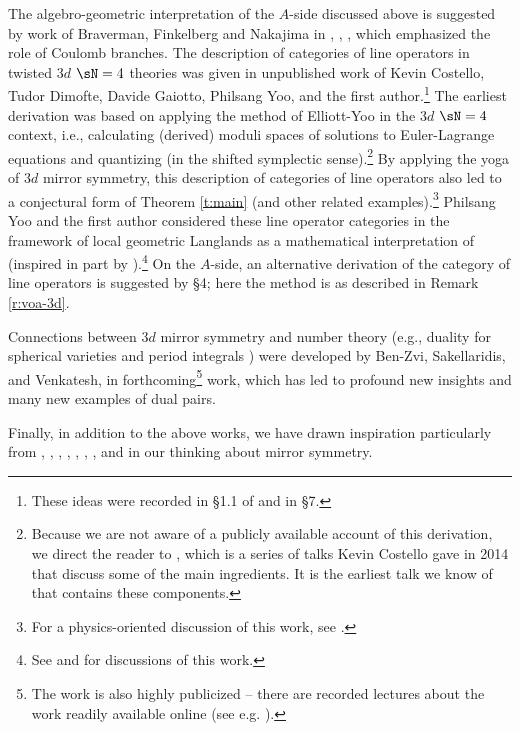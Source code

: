 The algebro-geometric interpretation of the $A$-side discussed
above is suggested by work of Braverman, Finkelberg and Nakajima
in \cite{nakajima-coulomb}, \cite{bfn}, \cite{bfn-slices},
which emphasized the role of Coulomb branches.
The description of categories of line operators in twisted $3d$ $\sN = 4$
theories was given in unpublished work of Kevin Costello,
Tudor Dimofte, Davide Gaiotto, Philsang Yoo, and the first
author.\footnote{These ideas were recorded in \S 1.1 of
\cite{dggh} and in \cite{bf-notes} \S 7.}
The earliest derivation
was based on applying the method of Elliott-Yoo \cite{elliott-yoo}
in the $3d$ $\sN = 4$ context,
i.e., calculating (derived) moduli spaces of solutions to Euler-Lagrange equations and
quantizing (in the shifted symplectic sense).\footnote{Because
we are not aware of a publicly available
account of this derivation, we direct the reader to \cite{costello-x-talks},
which is a series of talks Kevin Costello gave in 2014 that discuss some of
the main ingredients. It is the earliest talk we know of that contains
these components.}
By applying the yoga of $3d$ mirror symmetry, this description of
categories of line operators also
led to a conjectural form of Theorem \ref{t:main}
(and other related examples).\footnote{For a physics-oriented discussion of this
work, see \cite{tudor-talk}.}
Philsang Yoo and the first author considered these line operator categories
in the framework of local geometric Langlands as a mathematical interpretation
of \cite{gaiotto-witten} (inspired in part by \cite{bfn-ring}).\footnote{See
\cite{phil-talk} and \cite{jh-talk} for discussions of this work.}
On the $A$-side, an alternative derivation of the category of
line operators is suggested by
\cite{voa-3d} \S 4; here the method is as described in Remark \ref{r:voa-3d}.

Connections between $3d$ mirror symmetry
and number theory (e.g., duality for spherical varieties and period
integrals \cite{sakellaridis-venkatesh}) were developed by Ben-Zvi, Sakellaridis,
and Venkatesh, in forthcoming\footnote{The work is also highly publicized --
there are recorded lectures about the work readily available online
(see e.g. \cite{bz-talk}).}
work, which has led to profound new insights and many new examples of
dual pairs.

Finally, in addition to the above works,
we have drawn inspiration particularly from \cite{bf-notes},
 \cite{blpw-hypertoric}, \cite{blpw}
\cite{bpw}, \cite{loop-spaces-and-connections},
\cite{char-field-thry},
\cite{krs}, \cite{ksv}, and \cite{teleman-icm} in our thinking about
mirror symmetry.

